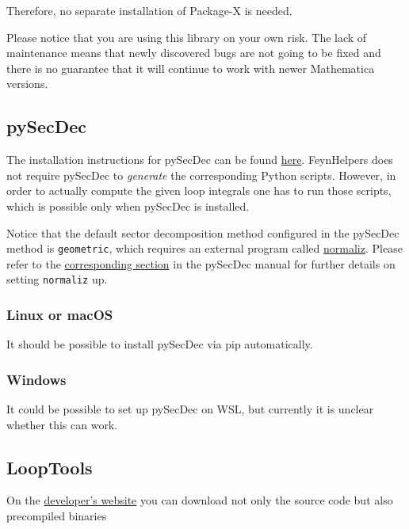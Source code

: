 \documentclass[../FeynHelpersManual.tex]{subfiles}
\begin{document}
Therefore, no separate installation of Package-X is needed.

Please notice that you are using this library on your own risk. The lack
of maintenance means that newly discovered bugs are not going to be
fixed and there is no guarantee that it will continue to work with newer
Mathematica versions.

\subsection{pySecDec}\label{pysecdec}

The installation instructions for pySecDec can be found
\href{https://secdec.readthedocs.io/en/stable/installation.html\#download-the-program-and-install}{here}.
FeynHelpers does not require pySecDec to \emph{generate} the
corresponding Python scripts. However, in order to actually compute the
given loop integrals one has to run those scripts, which is possible
only when pySecDec is installed.

Notice that the default sector decomposition method configured in the
pySecDec method is \texttt{geometric}, which requires an external
program called \href{https://www.normaliz.uni-osnabrueck.de}{normaliz}.
Please refer to the
\href{https://secdec.readthedocs.io/en/stable/installation.html?highlight=normaliz\#the-geomethod-and-normaliz}{corresponding
section} in the pySecDec manual for further details on setting
\texttt{normaliz} up.

\subsubsection{Linux or macOS}\label{linux-or-macos}

It should be possible to install pySecDec via pip automatically.

\subsubsection{Windows}\label{windows-3}

It could be possible to set up pySecDec on WSL, but currently it is
unclear whether this can work.

\subsection{LoopTools}\label{looptools}

On the \href{http://www.feynarts.de/looptools/}{developer's website} you
can download not only the source code but also precompiled binaries
\end{document}
